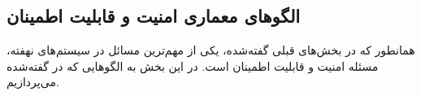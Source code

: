 \subsection{الگوهای معماری امنیت و قابلیت اطمینان}
\begin{RTL}
همانطور که در بخش‌های قبلی گفته‌شده، یکی از مهم‌ترین مسائل در سیستم‌های نهفته،
مسئله امنیت  و قابلیت اطمینان 
است. در این بخش به الگوهایی که در \cite{ref4} گفته‌شده می‌پردازیم.
\end{RTL}







